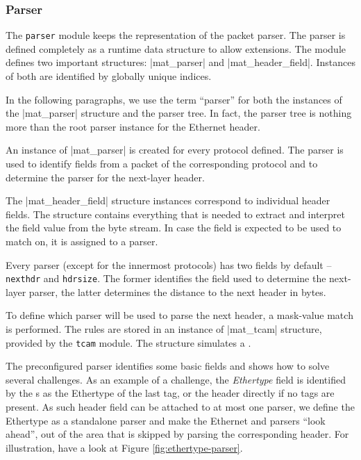 \subsubsection{Parser}

The \texttt{parser} module keeps the representation of the packet parser. The
parser is defined completely as a runtime data structure to allow extensions.
The module defines two important structures: \struct|mat_parser| and
\struct|mat_header_field|. Instances of both are identified by globally unique indices.

In the following paragraphs, we use the term ``parser'' for both the instances of
the \struct|mat_parser| structure and the parser tree. In fact, the parser tree is
nothing more than the root parser instance for the Ethernet header.

An instance of \struct|mat_parser| is created for every protocol defined. The
parser is used to identify fields from a packet of the corresponding protocol
and to determine the parser for the next-layer header.

The \struct|mat_header_field| structure instances correspond to individual
header fields. The structure contains everything that is needed to extract and
interpret the field value from the byte stream. In case the field is expected
to be used to match on, it is assigned to a parser.

Every parser (except for the innermost protocols) has two fields by default
-- \Verb|nexthdr| and \Verb|hdrsize|. The former identifies the field used
to determine the next-layer parser, the latter determines the distance to the
next header in bytes.

To define which parser will be used to parse the next header, a mask-value
match is performed. The rules are stored in an instance of \struct|mat_tcam| structure,
provided by the \texttt{tcam} module. The structure simulates a .

The preconfigured parser identifies some basic fields and shows how to solve
several challenges. As an example of a challenge, the \emph{Ethertype} field is
identified by the s as the Ethertype of the last  tag, or the
 header directly if no  tags are present. As such header field can
be attached to at most one parser, we define the Ethertype as a standalone
parser and make the Ethernet and  parsers ``look ahead'', out of the
area that is skipped by parsing the corresponding header. For illustration, have a look at
Figure \ref{fig:ethertype-parser}.

